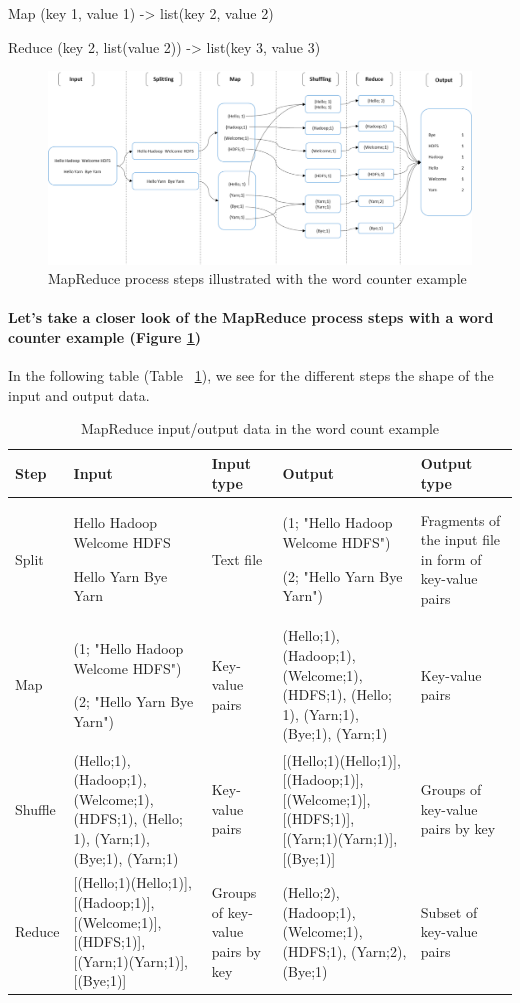 \documentclass[12pt,english]{book}
\begin{document}
Map		(key 1, value 1)		->		list(key 2, value 2)

Reduce	(key 2, list(value 2))	->		list(key 3, value 3)

\begin{figure}[ht]
	\centering
	\includegraphics[width=\linewidth]{mapReduceSchema}
	\caption{MapReduce process steps illustrated with the word counter example}
\label{fig:wordCountExample}
\end{figure}


\paragraph{Let's take a closer look of the MapReduce process steps with a word counter example (Figure \ref{fig:wordCountExample})}


In the following table (Table ~\ref{tbl:wordCountExample}), we see for the different steps the shape of the input and output data.

\begin{table}[H]
\begin{tabular}{|p{1.4cm}|p{3.4cm}|p{1.5cm}|p{3.3cm}|p{2cm}|}
\hline
\rowcolor[HTML]{CBCEFB} 
Step & Input & Input type & Output & Output type
\\ \hline
Split &
Hello Hadoop Welcome HDFS \par Hello Yarn Bye Yarn &
Text file &
(1; "Hello Hadoop Welcome HDFS") \par (2; "Hello Yarn Bye Yarn") &
Fragments of the input file in form of key-value pairs
\\ \hline
\rowcolor[HTML]{EDEDED}
Map & 
(1; "Hello Hadoop Welcome HDFS") \par (2; "Hello Yarn Bye Yarn") &
Key-value pairs &
(Hello;1), (Hadoop;1), (Welcome;1), (HDFS;1), (Hello; 1), (Yarn;1), (Bye;1), (Yarn;1) &
Key-value pairs
\\ \hline
Shuffle &
(Hello;1), (Hadoop;1), (Welcome;1), (HDFS;1), (Hello; 1), (Yarn;1), (Bye;1), (Yarn;1) &
Key-value pairs &
[(Hello;1)(Hello;1)], [(Hadoop;1)], [(Welcome;1)], [(HDFS;1)], [(Yarn;1)(Yarn;1)], [(Bye;1)] &
Groups of key-value pairs by key
\\ \hline
\rowcolor[HTML]{EDEDED}
Reduce & 
[(Hello;1)(Hello;1)], [(Hadoop;1)], [(Welcome;1)], [(HDFS;1)], [(Yarn;1)(Yarn;1)], [(Bye;1)] &
Groups of key-value pairs by key & 
(Hello;2), (Hadoop;1), (Welcome;1), (HDFS;1), (Yarn;2), (Bye;1) &
Subset of key-value pairs 
\\ \hline
\end{tabular}
\caption{MapReduce input/output data in the word count example}
\label{tbl:wordCountExample}
\end{table}
\end{document}
